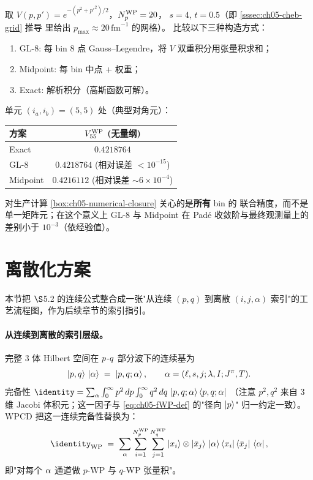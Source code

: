 \begin{example}
\label{ex:ch05-midpoint}
取 \(V(p, p') = e^{-(p^2 + p'^2)/2}\)，\({N_{p}^{\text{WP}}} = 20\)，
\(s = 4\), \(t = 0.5\)（即 \cref{sssec:ch05-cheb-grid} 推导
里给出 \(p_{\max} \approx 20\,\mathrm{fm}^{-1}\) 的网格）。
比较以下三种构造方式：
\begin{enumerate}
  \item GL-8: 每 bin 8 点 Gauss--Legendre，将 \(V\) 双重积分用张量积求和；
  \item Midpoint: 每 bin 中点 + 权重；
  \item Exact: 解析积分（高斯函数可解）。
\end{enumerate}
单元 \((i_a, i_b) = (5, 5)\) 处（典型对角元）：
\begin{center}
\begin{tabular}{lc}
\toprule
方案 & \(V_{55}^{\rm WP}\) (无量纲) \\
\midrule
Exact      & \(0.4218764\) \\
GL-8       & \(0.4218764\) (相对误差 \(<10^{-15}\)) \\
Midpoint   & \(0.4216112\) (相对误差 \(\sim 6 \times 10^{-4}\)) \\
\bottomrule
\end{tabular}
\end{center}
对生产计算 \cref{box:ch05-numerical-closure} 关心的是\textbf{所有} bin 的
联合精度，而不是单一矩阵元；在这个意义上 GL-8 与 Midpoint 在 Padé
收敛阶与最终观测量上的差别小于 \(10^{-3}\)（依经验值）。
\end{example}

\section{离散化方案}
\label{sec:ch05-discretization}

本节把 \(\S\)5.2 的连续公式整合成一张"从连续 \((p, q)\) 到离散
\((i, j, \alpha)\) 索引"的工艺流程图，作为后续章节的索引指引。

\paragraph{从连续到离散的索引层级。}
完整 3 体 Hilbert 空间在 \(p\)-\(q\) 部分波下的连续基为
\begin{equation}
\label{eq:ch05-pq-alpha-state}
\ket{p, q}\,\ket{\alpha}
\;=\;
\ket{p, q; \alpha},
\qquad
\alpha = (\ell, s, j; \lambda, I; J^\pi, T).
\end{equation}
完备性
\(\identity = \sum_{\PWchan}\int_0^\infty p^2\,dp \int_0^\infty q^2\,dq
\,\ket{p, q; \PWchan}\bra{p, q; \PWchan}\)
（注意 \(p^2, q^2\) 来自 3 维 Jacobi 体积元；这一因子与
\cref{eq:ch05-fWP-def} 的"径向 \(\ket{p}\)" 归一约定一致）。
WPCD 把这一连续完备性替换为：
\begin{equation}
\label{eq:ch05-completeness-WP}
\identity_{\rm WP}
\;=\;
\sum_{\PWchan} \sum_{i = 1}^{\NpWP} \sum_{j = 1}^{\NqWP}
   \WPbin{i} \otimes \ket{\bar{x}_j}\,\pwstate{\PWchan}
   \bra{x_i}\bra{\bar{x}_j}\,\pwdual{\PWchan},
\end{equation}
即"对每个 \(\alpha\) 通道做 \(p\)-WP 与 \(q\)-WP 张量积"。

